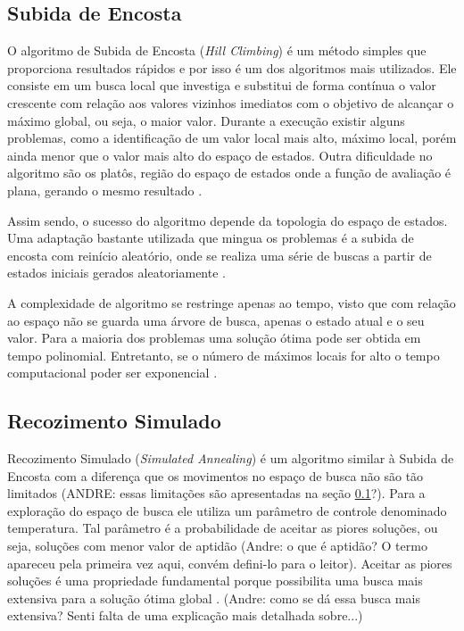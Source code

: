 \subsection{Subida de Encosta}
\label{sec:subidaDeEncosta}

O algoritmo de Subida de Encosta (\textit{Hill Climbing}) é um método simples que proporciona resultados rápidos e por isso é um dos algoritmos mais utilizados. Ele consiste em um busca local que investiga e substitui de forma contínua o valor crescente com relação aos valores vizinhos imediatos com o objetivo de alcançar o máximo global, ou seja, o maior valor. Durante a execução existir alguns problemas, como a identificação de um valor local mais alto, máximo local, porém ainda menor que o valor mais alto do espaço de estados. Outra dificuldade no algoritmo são os platôs, região do espaço de estados onde a função de avaliação é plana, gerando o mesmo resultado \cite{russell2016artificial}.

Assim sendo, o sucesso do algoritmo depende da topologia do espaço de estados. Uma adaptação bastante utilizada que mingua os problemas é a subida de encosta com reinício aleatório, onde se realiza uma série de buscas a partir de estados iniciais gerados aleatoriamente \cite{russell2016artificial}. 

A complexidade de algoritmo se restringe apenas ao tempo, visto que com relação ao espaço não se guarda uma árvore de busca, apenas o estado atual e o seu valor. Para a maioria dos problemas uma solução ótima pode ser obtida em tempo polinomial. Entretanto, se o número de máximos locais for alto o tempo computacional poder ser exponencial \cite{skiena1998algorithm}.

\subsection{Recozimento Simulado}

Recozimento Simulado (\textit{Simulated Annealing}) é um algoritmo similar à Subida de Encosta com a diferença que os movimentos no espaço de busca não são tão limitados (ANDRE: essas limitações são apresentadas na seção \ref{sec:subidaDeEncosta}?). Para a exploração do espaço de busca ele utiliza um parâmetro de controle denominado temperatura. Tal parâmetro é a probabilidade de aceitar as piores soluções, ou seja, soluções com menor valor de aptidão (Andre: o que é aptidão? O termo apareceu pela primeira vez aqui, convém defini-lo para o leitor).  Aceitar as piores soluções é uma propriedade fundamental porque possibilita uma busca mais extensiva para a solução ótima global \cite{kirkpatrick1983optimization}. (Andre: como se dá essa busca mais extensiva? Senti falta de uma explicação mais detalhada sobre...)

